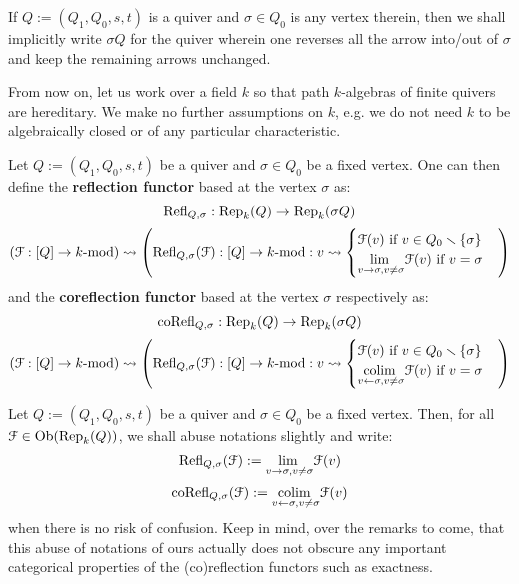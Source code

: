             \begin{convention}
                If $Q := (Q_1, Q_0, s, t)$ is a quiver and $\sigma \in Q_0$ is any vertex therein, then we shall implicitly write $\sigma Q$ for the quiver wherein one reverses all the arrow into/out of $\sigma$ and keep the remaining arrows unchanged.
            \end{convention}
            \begin{convention}
                From now on, let us work over a field $k$ so that path $k$-algebras of finite quivers are hereditary. We make no further assumptions on $k$, e.g. we do not need $k$ to be algebraically closed or of any particular characteristic.
            \end{convention}
            \begin{definition} \label{def: (co)reflection_functors}
                Let $Q := (Q_1, Q_0, s, t)$ be a quiver and $\sigma \in Q_0$ be a fixed vertex. One can then define the \textbf{reflection functor} based at the vertex $\sigma$ as:
                    $$\mathrm{Refl}_{Q, \sigma}: \mathrm{Rep}_k(Q) \to \mathrm{Rep}_k(\sigma Q)$$
                    $$(\mathcal{F}: [Q] \to k\text{-}\mathrm{mod}) \leadsto \left( \mathrm{Refl}_{Q, \sigma}(\mathcal{F}): [Q] \to k\text{-}\mathrm{mod}: v \leadsto \begin{cases} \text{$\mathcal{F}(v)$ if $v \in Q_0 \smallsetminus \{\sigma\}$} \\ \text{$\underset{v \to \sigma, v \not = \sigma}{\operatorname{lim} \:} \mathcal{F}(v)$ if $v = \sigma$} \end{cases} \right)$$
                and the \textbf{coreflection functor} based at the vertex $\sigma$ respectively as:
                    $$\mathrm{co}\mathrm{Refl}_{Q, \sigma}: \mathrm{Rep}_k(Q) \to \mathrm{Rep}_k(\sigma Q)$$
                    $$(\mathcal{F}: [Q] \to k\text{-}\mathrm{mod}) \leadsto \left( \mathrm{Refl}_{Q, \sigma}(\mathcal{F}): [Q] \to k\text{-}\mathrm{mod}: v \leadsto \begin{cases} \text{$\mathcal{F}(v)$ if $v \in Q_0 \smallsetminus \{\sigma\}$} \\ \text{$\underset{v \leftarrow \sigma, v \not = \sigma}{\operatorname{colim} \:} \mathcal{F}(v)$ if $v = \sigma$} \end{cases} \right)$$
            \end{definition}
            \begin{convention}
                Let $Q := (Q_1, Q_0, s, t)$ be a quiver and $\sigma \in Q_0$ be a fixed vertex. Then, for all $\mathcal{F} \in \mathrm{Ob}(\mathrm{Rep}_k(Q))$, we shall abuse notations slightly and write:
                    $$\mathrm{Refl}_{Q, \sigma}(\mathcal{F}) := \underset{v \to \sigma, v \not = \sigma}{\operatorname{lim} \:} \mathcal{F}(v)$$
                    $$\mathrm{co}\mathrm{Refl}_{Q, \sigma}(\mathcal{F}) := \underset{v \leftarrow \sigma, v \not = \sigma}{\operatorname{colim} \:} \mathcal{F}(v)$$
                when there is no risk of confusion. Keep in mind, over the remarks to come, that this abuse of notations of ours actually does not obscure any important categorical properties of the (co)reflection functors such as exactness.
            \end{convention}
